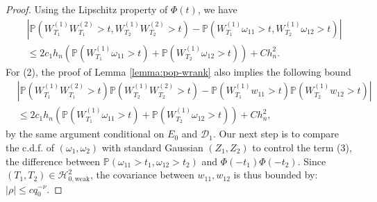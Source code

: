 \documentclass[12pt]{article}
\newcommand{\abs}[1]{\left\lvert#1\right\rvert}
\newcommand{\PP}{\mathbb{P}}
\newcommand{\E}{\mathbb{E}}
\newcommand{\cH}{\mathcal{H}}
\newcommand{\cD}{\mathcal{D}}
\newcommand{\cN}{\mathcal{N}}
\def\PP{{\mathbb P}}
\theoremstyle{plain}
\begin{document}
\begin{proof}
Using the Lipschitz property of $\Phi(t)$, we have 
\begin{equation}\label{eq:bound-w-omega}
\begin{aligned}
         &\abs{\PP(W^{(1)}_{T_1}W^{(2)}_{T_1} >t, W^{(1)}_{T_2}W^{(2)}_{T_2}>t )- \PP(W^{(1)}_{T_1}\omega_{11}>t, W^{(1)}_{T_2}\omega_{12}>t )} \\
         &\le 2c_1 h_n\left(\PP(W^{(1)}_{T_1}\omega_{11}>t) +\PP(W^{(1)}_{T_2}\omega_{12}>t)  \right) +Ch_n^2.
\end{aligned}
\end{equation}
For (2), the proof of Lemma \ref{lemma:pop-wrank} also implies the following bound 
\begin{equation}\label{eq:bound-w-omega-2}
\begin{aligned}
        &\abs{\PP(W^{(1)}_{T_1}W^{(2)}_{T_1} >t )\PP(W^{(1)}_{T_2}W^{(2)}_{T_2} >t )- \PP( {W}^{(1)}_{T_1} w_{11} > t  )\PP( {W}^{(1)}_{T_2} w_{12} > t  ) } \\
        &\le 2c_1 h_n\left(\PP(W^{(1)}_{T_1}\omega_{11}>t) +\PP(W^{(1)}_{T_2}\omega_{12}>t)  \right) +Ch_n^2, 
\end{aligned}
\end{equation}
by the same argument conditional on $E_0$ and $\cD_1$. Our next step is to compare the c.d.f. of $(\omega_1,\omega_2)$ with standard Gaussian $(Z_1,Z_2)$ to control the term (3), the difference between $\PP(\omega_{11} >t_1, \omega_{12}>t_2)$ and $\Phi(-t_1)\Phi(-t_2) $. Since $(T_1,T_2)\in \cH_{0,\text{weak} }^2$, the covariance between $w_{11},w_{12}$ is thus bounded by: $\abs{\rho}\le c q_0^{-\nu}$.


\end{proof}
\end{document}

